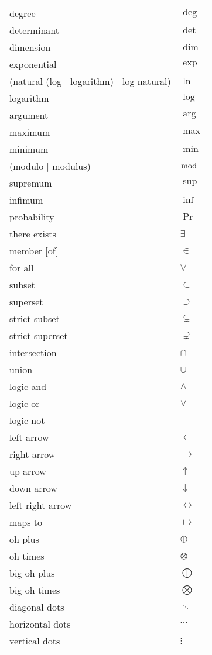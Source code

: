 \documentclass[12pt]{article}
\begin{document}
\begin{longtable}{ l l}
degree & $\deg$ \\
determinant & $\det$ \\
dimension & $\dim$ \\
exponential & $\exp$ \\
(natural (log | logarithm) | log natural) & $\ln$ \\
logarithm & $\log$ \\
argument & $\arg$ \\
maximum & $\max$ \\
minimum & $\min$ \\
(modulo | modulus) & $\bmod$ \\
supremum & $\sup$ \\
infimum & $\inf$ \\
probability & $\Pr$ \\
there exists & $\exists$ \\
member [of] & $\in$ \\
for all & $\forall$ \\
subset & $\subset$ \\
superset & $\supset$ \\
strict subset & $\subsetneq$ \\
strict superset & $\supsetneq$ \\
intersection & $\cap$ \\
union & $\cup$ \\
logic and & $\land$ \\
logic or & $\lor$ \\
logic not & $\lnot$ \\
left arrow & $\leftarrow$ \\
right arrow & $\rightarrow$ \\
up arrow & $\uparrow$ \\
down arrow & $\downarrow$ \\
left right arrow & $\leftrightarrow$ \\
maps to & $\mapsto$ \\
oh plus & $\oplus$ \\
oh times & $\otimes$ \\
big oh plus & $\bigoplus$ \\
big oh times & $\bigotimes$ \\
diagonal dots & $\ddots$ \\
horizontal dots & $\cdots$ \\
vertical dots & $\vdots$ \\
\end{longtable}
\end{document}

